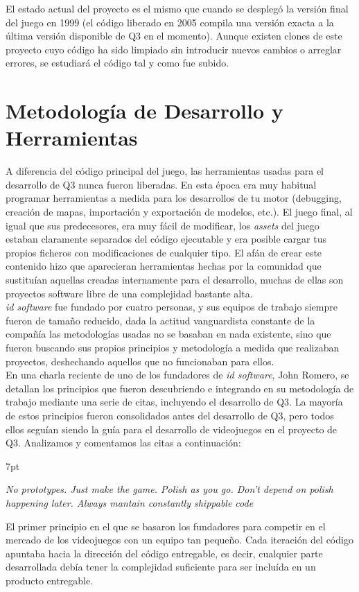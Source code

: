 \documentclass[a4paper,12pt]{report}
\newenvironment{formal}{%
	\def\FrameCommand{%
		\hspace{1pt}%
		{\color{darkblue}\vrule width 2pt}%
		{\color{formalshade}\vrule width 4pt}%
		\colorbox{formalshade}%
	}%
	\MakeFramed{\advance\hsize-\width\FrameRestore}%
	\noindent\hspace{-4.55pt}%
	\begin{adjustwidth}{}{7pt}%
		\vspace{2pt}\vspace{2pt}%
	}
	{%
		\vspace{2pt}\end{adjustwidth}\endMakeFramed%
}
\begin{document}
	El estado actual del proyecto es el mismo que cuando se desplegó la versión final del juego en 1999 (el código liberado en 2005 compila una versión exacta a la última versión disponible de Q3 en el momento). Aunque existen clones de este proyecto cuyo código ha sido limpiado sin introducir nuevos cambios o arreglar errores, se estudiará el código tal y como fue subido.\\
	
	
	\section{Metodología de Desarrollo y Herramientas}
	A diferencia del código principal del juego, las herramientas usadas para el desarrollo de Q3 nunca fueron liberadas. En esta época era muy habitual programar herramientas a medida para los desarrollos de tu motor (debugging, creación de mapas, importación y exportación de modelos, etc.). El juego final, al igual que sus predecesores, era muy fácil de modificar, los \textit{assets} del juego estaban claramente separados del código ejecutable y era posible cargar tus propios ficheros con modificaciones de cualquier tipo. El afán de crear este contenido hizo que aparecieran herramientas hechas por la comunidad que sustituían aquellas creadas internamente para el desarrollo, muchas de ellas son proyectos software libre de una complejidad bastante alta.\\
	
	\textit{id software} fue fundado por cuatro personas, y sus equipos de trabajo siempre fueron de tamaño reducido, dada la actitud vanguardista constante de la compañía las metodologías usadas no se basaban en nada existente, sino que fueron buscando sus propios principios y metodología a medida que realizaban proyectos, deshechando aquellos que no funcionaban para ellos.\\
	
	En una charla reciente de uno de los fundadores de \textit{id software}, John Romero, se detallan los principios que fueron descubriendo e integrando en su metodología de trabajo mediante una serie de citas, incluyendo el desarrollo de Q3. La mayoría de estos principios fueron consolidados antes del desarrollo de Q3, pero todos ellos seguían siendo la guía para el desarrollo de videojuegos en el proyecto de Q3. Analizamos y comentamos las citas a continuación:\\
	
	\begin{formal}
		\textit{No prototypes. Just make the game. Polish as you go. Don't depend on polish happening later. Always mantain constantly shippable code}
	\end{formal}
	El primer principio en el que se basaron los fundadores para competir en el mercado de los videojuegos con un equipo tan pequeño. Cada iteración del código apuntaba hacia la dirección del código entregable, es decir, cualquier parte desarrollada debía tener la complejidad suficiente para ser incluída en un producto entregable.
	
\end{document}
